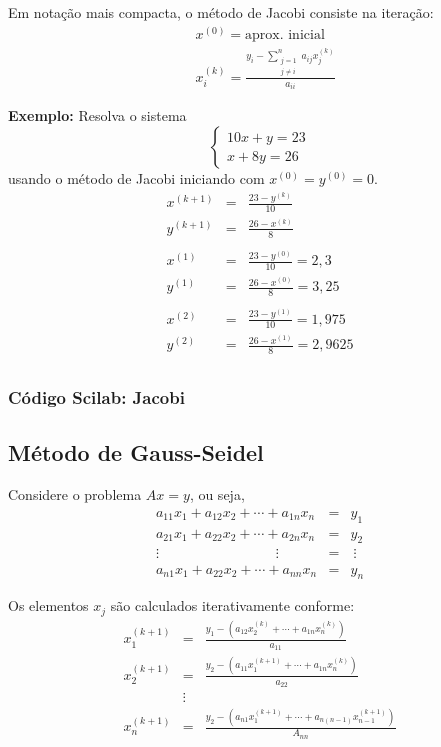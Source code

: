 Em notação mais compacta, o método de Jacobi consiste na iteração:
\begin{align*}
  &x^{(0)} = \text{aprox. inicial}\\
  &x_i^{(k)} = \frac{y_i - \displaystyle{\sum_{\substack{j=1\\j\neq i}}^{n} a_{ij}x_j^{(k)}}}{a_{ii}}
\end{align*}

{\bf Exemplo:} Resolva o sistema $$\left\{\begin{array}{l}10x+y=23\\x+8y=26\end{array}\right.$$
usando o método de Jacobi iniciando com $x^{(0)}=y^{(0)}=0$.
\begin{eqnarray*}
x^{(k+1)}&=&\frac{23-y^{(k)}}{10}\\
y^{(k+1)}&=&\frac{26-x^{(k)}}{8}\\
\\
x^{(1)}&=&\frac{23-y^{(0)}}{10}=2,3\\
y^{(1)}&=&\frac{26-x^{(0)}}{8}=3,25\\
\\
x^{(2)}&=&\frac{23-y^{(1)}}{10}=1,975 \\
y^{(2)}&=&\frac{26-x^{(1)}}{8}=2,9625\\
\end{eqnarray*}

\ifisscilab
\subsubsection{Código Scilab: Jacobi}


\fi

\subsection{Método de Gauss-Seidel}

Considere o problema $Ax=y$, ou seja,
\begin{eqnarray*}
a_{11}x_1+a_{12}x_2+\cdots+a_{1n}x_n&=&y_1\\
a_{21}x_1+a_{22}x_2+\cdots+a_{2n}x_n&=&y_2\\
\vdots \hspace{100pt}\vdots~~~~&=&~\vdots\\
a_{n1}x_1+a_{22}x_2+\cdots+a_{nn}x_n&=&y_n
\end{eqnarray*}

Os elementos $x_j$ são calculados iterativamente conforme:
\begin{eqnarray*}
x_1^{(k+1)}&=& \frac{y_1 - \left(a_{12}x_2^{(k)}+\cdots+a_{1n}x_n^{(k)}\right)}{a_{11}}\\
x_2^{(k+1)}&=&\frac{y_2 - \left(a_{11}x_1^{(k+1)}+\cdots+a_{1n}x_n^{(k)}\right)}{a_{22}}\\
&\vdots&\\
x_n^{(k+1)}&=&\frac{y_2 - \left(a_{n1}x_1^{(k+1)}+\cdots+a_{n(n-1)}x_{n-1}^{(k+1)}\right)}{A_{nn}}
\end{eqnarray*}

